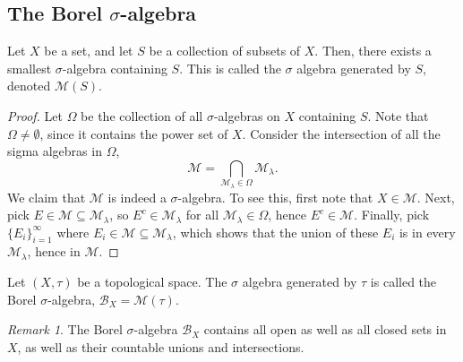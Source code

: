 \documentclass[11pt]{article}
\newcommand{\M}{\mathcal{M}}
\theoremstyle{definition}
\theoremstyle{remark}
\newtheorem*{remark}{Remark}
\numberwithin{equation}{section}
\begin{document}
    \subsection{The Borel $\sigma$-algebra}

    \begin{theorem}
        Let $X$ be a set, and let $S$ be a collection of subsets of $X$. Then, there
        exists a smallest $\sigma$-algebra containing $S$. This is called the
        $\sigma$ algebra generated by $S$, denoted $\M(S)$.
    \end{theorem}
    \begin{proof}
        Let $\Omega$ be the collection of all $\sigma$-algebras on $X$ containing
        $S$. Note that $\Omega \neq \emptyset$, since it contains the power set of
        $X$. Consider the intersection of all the sigma algebras in $\Omega$, \[
            \M = \bigcap_{\M_\lambda \in \Omega} \M_\lambda.
        \] We claim that $\M$ is indeed a $\sigma$-algebra. To see this, first note
        that $X \in \M$. Next, pick $E \in \M \subseteq \M_\lambda$, so $E^c \in
        \M_\lambda$ for all $\M_\lambda \in \Omega$, hence $E^c \in \M$. Finally,
        pick $\{E_i\}_{i = 1}^\infty$ where $E_i \in \M \subseteq \M_\lambda$, which
        shows that the union of these $E_i$ is in every $\M_\lambda$, hence in $\M$.
    \end{proof}

    \begin{definition}
        Let $(X, \tau)$ be a topological space. The $\sigma$ algebra generated by
        $\tau$ is called the Borel $\sigma$-algebra, $\mathcal{B}_X = \M(\tau)$.
        \begin{remark}
            The Borel $\sigma$-algebra $\mathcal{B}_X$ contains all open as well as
            all closed sets in $X$, as well as their countable unions and
            intersections.
        \end{remark}
    \end{definition}
    

    
\end{document}

